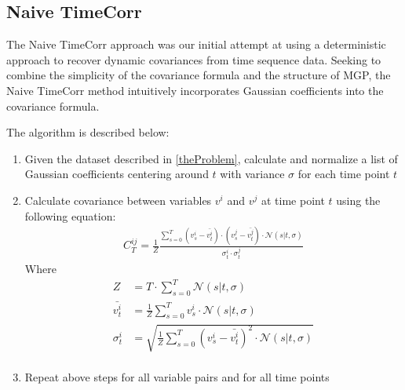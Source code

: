 \documentclass[12pt]{article}
\begin{document}
\subsection{Naive TimeCorr}
The Naive TimeCorr approach was our initial attempt at using a deterministic approach to recover dynamic covariances from time sequence data. Seeking to combine the simplicity of the covariance formula and the structure of MGP, the Naive TimeCorr method intuitively incorporates Gaussian coefficients into the covariance formula.\par
The algorithm is described below:
\begin{enumerate}
\item Given the dataset described in \ref{theProblem}, calculate and normalize a list of Gaussian coefficients centering around $t$ with variance $\sigma$ for each time point $t$
\item Calculate covariance between variables $v^i$ and $v^j$ at time point $t$ using the following equation:
\begin{align*}
C^{ij}_T = \frac{1}{Z}\frac{\sum_{s=0}^T (v^i_s - \bar{v^i_t})\cdot(v^j_s - \bar{v^j_t})\cdot \mathcal{N}(s|t,\sigma)}{\sigma_t^i \cdot \sigma_t^j}
\end{align*}
Where
\begin{align*}
Z &= T\cdot \sum_{s=0}^T \mathcal{N}(s|t,\sigma)\\
\bar{v^i_t} &=\frac{1}{Z} \sum_{s=0}^T v^i_s \cdot \mathcal{N}(s|t,\sigma)\\
\sigma_t^i &=\sqrt{ \frac{1}{Z}\sum_{s=0}^T (v_s^i-\bar{v_t^i})^2 \cdot \mathcal{N}(s|t,\sigma)}\\
\end{align*}
\item Repeat above steps for all variable pairs and for all time points
\end{enumerate}
\end{document}
